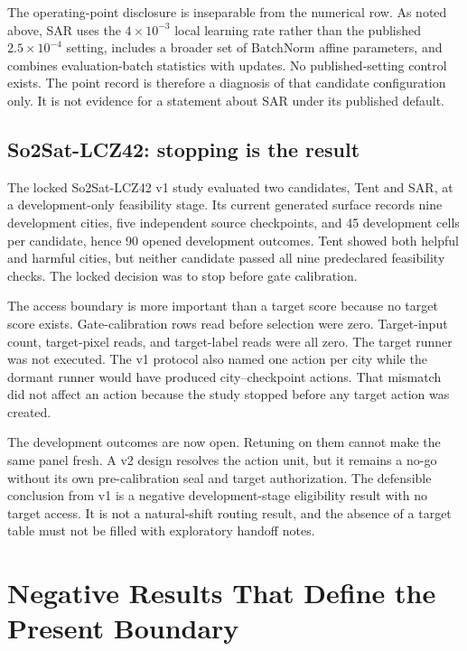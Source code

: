 The operating-point disclosure is inseparable from the numerical row.  As noted above, SAR uses
the $4\times10^{-3}$ local learning rate rather than the published $2.5\times10^{-4}$ setting,
includes a broader set of BatchNorm affine parameters, and combines evaluation-batch statistics
with updates.  No published-setting control exists.  The point record is therefore a diagnosis of
that candidate configuration only.  It is not evidence for a statement about SAR under its
published default.

\subsection{So2Sat-LCZ42: stopping is the result}
\label{fr:sec-so2sat-dossier}

The locked So2Sat-LCZ42 v1 study evaluated two candidates, Tent and SAR, at a development-only
feasibility stage.  Its current generated surface records nine development cities, five independent
source checkpoints, and 45 development cells per candidate, hence 90 opened development outcomes.
Tent showed both helpful and harmful cities, but neither candidate passed all nine predeclared
feasibility checks.  The locked decision was to stop before gate calibration.

The access boundary is more important than a target score because no target score exists.
Gate-calibration rows read before selection were zero.  Target-input count, target-pixel reads, and
target-label reads were all zero.  The target runner was not executed.  The v1 protocol also named
one action per city while the dormant runner would have produced city--checkpoint actions.  That
mismatch did not affect an action because the study stopped before any target action was created.

The development outcomes are now open.  Retuning on them cannot make the same panel fresh.  A v2
design resolves the action unit, but it remains a no-go without its own pre-calibration seal and
target authorization.  The defensible conclusion from v1 is a negative development-stage
eligibility result with no target access.  It is not a natural-shift routing result, and the absence
of a target table must not be filled with exploratory handoff notes.

\section{Negative Results That Define the Present Boundary}
\label{fr:sec-negative-results}

